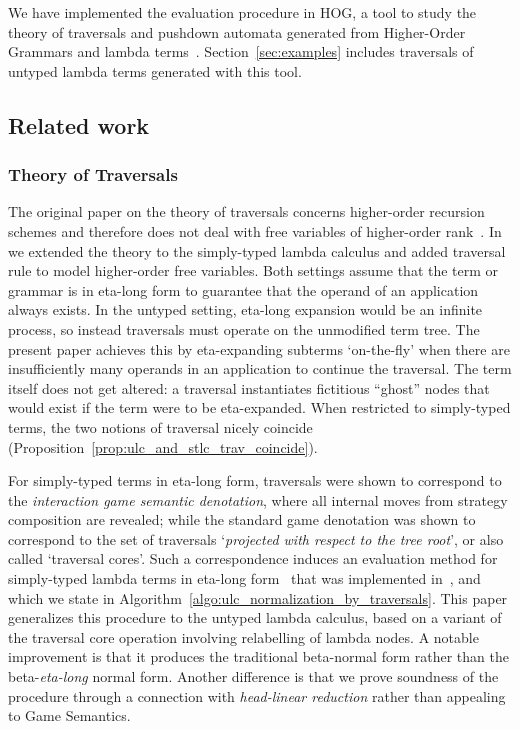 \documentclass{elsarticle}
\theoremstyle{plain}
\theoremstyle{definition}
\begin{document}
 We have implemented the evaluation procedure in HOG, a tool to study the theory of traversals and pushdown automata generated from Higher-Order Grammars and lambda terms~\cite{BlumGalop2008,Blum-HogTool}.  Section~\ref{sec:examples} includes traversals of untyped lambda terms generated with this tool.

\subsection{Related work}

\subsubsection{Theory of Traversals}

The original paper on the theory of traversals concerns higher-order recursion schemes and therefore does not deal with free variables of higher-order rank~\cite{OngLics2006}. In~\cite{BlumPhd} we extended the theory to the simply-typed lambda calculus and added traversal rule to model higher-order free variables. Both settings assume that the term or grammar is in eta-long form to guarantee that the operand of an application always exists.
In the untyped setting, eta-long expansion would be an infinite process, so instead traversals must operate on the unmodified term tree.
The present paper achieves this by eta-expanding subterms `on-the-fly' when there are insufficiently many operands in an application to continue the traversal. The term itself does not get altered: a traversal instantiates fictitious ``ghost'' nodes that would exist if the term were to be eta-expanded.
When restricted to simply-typed terms, the two notions of traversal nicely coincide (Proposition~\ref{prop:ulc_and_stlc_trav_coincide}).

For simply-typed terms in eta-long form, traversals were shown to correspond to the \emph{interaction game semantic denotation}, where all internal moves from strategy composition are revealed; while the standard game denotation was shown to correspond to the set of traversals `\emph{projected with respect to the tree root}', or also called `traversal cores'. Such a correspondence induces an evaluation method for simply-typed lambda terms in eta-long form~\cite{BlumPhd,BlumGalop2008,Ong-NormByTrav2015} that was implemented in~\cite{Blum-HogTool}, and which we state in Algorithm~\ref{algo:ulc_normalization_by_traversals}. This paper generalizes this procedure to the untyped lambda calculus, based on a variant of the traversal core operation involving relabelling of lambda nodes. A notable improvement is that it produces the traditional beta-normal form rather than the beta-\emph{eta-long} normal form. Another difference is that we prove soundness of the procedure through a connection with \emph{head-linear reduction} rather than appealing to Game Semantics.
\end{document}
